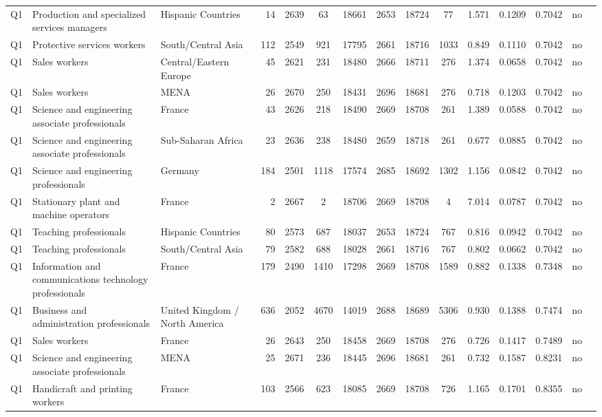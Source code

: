 \begin{longtable}{lllrcccccccccll}
Q1 & Production and specialized services managers & Hispanic Countries & 14 & 2639 & 63 & 18661 & 2653 & 18724 & 77 & 1.571 & 0.1209 & 0.7042 & no \\
Q1 & Protective services workers & South/Central Asia & 112 & 2549 & 921 & 17795 & 2661 & 18716 & 1033 & 0.849 & 0.1110 & 0.7042 & no \\
Q1 & Sales workers & Central/Eastern Europe & 45 & 2621 & 231 & 18480 & 2666 & 18711 & 276 & 1.374 & 0.0658 & 0.7042 & no \\
Q1 & Sales workers & MENA & 26 & 2670 & 250 & 18431 & 2696 & 18681 & 276 & 0.718 & 0.1203 & 0.7042 & no \\
Q1 & Science and engineering associate professionals & France & 43 & 2626 & 218 & 18490 & 2669 & 18708 & 261 & 1.389 & 0.0588 & 0.7042 & no \\
Q1 & Science and engineering associate professionals & Sub-Saharan Africa & 23 & 2636 & 238 & 18480 & 2659 & 18718 & 261 & 0.677 & 0.0885 & 0.7042 & no \\
Q1 & Science and engineering professionals & Germany & 184 & 2501 & 1118 & 17574 & 2685 & 18692 & 1302 & 1.156 & 0.0842 & 0.7042 & no \\
Q1 & Stationary plant and machine operators & France & 2 & 2667 & 2 & 18706 & 2669 & 18708 & 4 & 7.014 & 0.0787 & 0.7042 & no \\
Q1 & Teaching professionals & Hispanic Countries & 80 & 2573 & 687 & 18037 & 2653 & 18724 & 767 & 0.816 & 0.0942 & 0.7042 & no \\
Q1 & Teaching professionals & South/Central Asia & 79 & 2582 & 688 & 18028 & 2661 & 18716 & 767 & 0.802 & 0.0662 & 0.7042 & no \\
Q1 & Information and communications technology professionals & France & 179 & 2490 & 1410 & 17298 & 2669 & 18708 & 1589 & 0.882 & 0.1338 & 0.7348 & no \\
Q1 & Business and administration professionals & United Kingdom / North America & 636 & 2052 & 4670 & 14019 & 2688 & 18689 & 5306 & 0.930 & 0.1388 & 0.7474 & no \\
Q1 & Sales workers & France & 26 & 2643 & 250 & 18458 & 2669 & 18708 & 276 & 0.726 & 0.1417 & 0.7489 & no \\
Q1 & Science and engineering associate professionals & MENA & 25 & 2671 & 236 & 18445 & 2696 & 18681 & 261 & 0.732 & 0.1587 & 0.8231 & no \\
Q1 & Handicraft and printing workers & France & 103 & 2566 & 623 & 18085 & 2669 & 18708 & 726 & 1.165 & 0.1701 & 0.8355 & no \\

\end{longtable}
